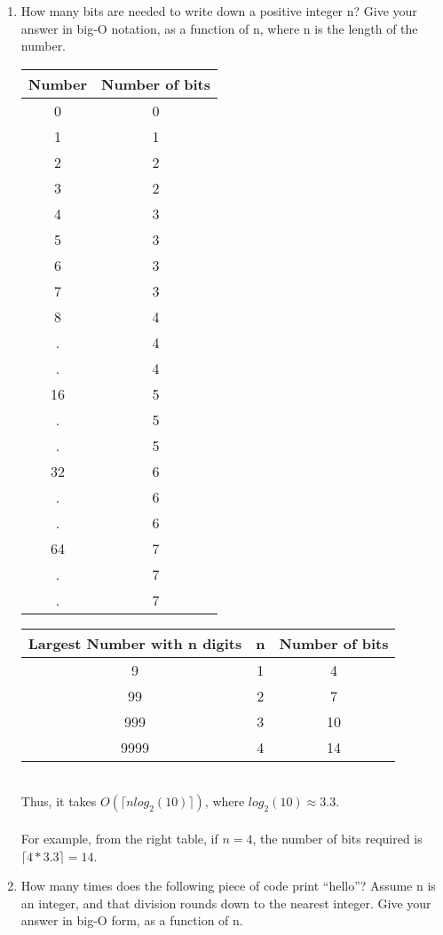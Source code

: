 \documentclass[12pt]{article}
\begin{document}
\begin{enumerate}
\begin{enumerate}
			\item How many bits are needed to write down a positive integer n? Give your answer in big-O notation,
			as a function of n, where n is the length of the number.
			\begin{tabular}{|c|c|}\hline
				Number &  Number of bits  \\ \hline
				0 & 0	\\ \hline
				1 & 1	\\ \hline
				2 & 2	\\ \hline
				3 & 2	\\ \hline
				4 & 3	\\ \hline
				5 & 3	\\ \hline
				6 & 3	\\ \hline
				7 & 3	\\ \hline
				8 & 4	\\ \hline
				. & 4	\\ \hline
				. & 4	\\ \hline
				16 & 5	\\ \hline
				. & 5	\\ \hline
				. & 5	\\ \hline
				32 & 6	\\ \hline
				. & 6	\\ \hline
				. & 6	\\ \hline
				64 & 7	\\ \hline
				. & 7	\\ \hline
				. & 7	\\ \hline
			\end{tabular} 
			\hspace{10mm}
			\begin{tabular}{|c|c|c|}\hline
				Largest Number with n digits &  n & Number of bits  \\ \hline
				9 & 1 & 4	\\ \hline
				99 & 2 & 7	\\ \hline
				999 & 3 & 10	\\ \hline
				9999 & 4 & 14	\\ \hline
			\end{tabular}
			\vspace{10mm} \\ 
			Thus, it takes $O(\lceil{n log_2(10)}\rceil)$, where $log_2(10) \approx 3.3$. \\ \\ For example, from the right table, if $n=4$, the number of bits required is $\lceil{4*3.3}\rceil = 14$. 
			\newpage	
			\item How many times does the following piece of code print “hello”? Assume n is an integer, and that
			division rounds down to the nearest integer. Give your answer in big-O form, as a function of n.
			

\end{enumerate}
\end{enumerate}
\end{document}
